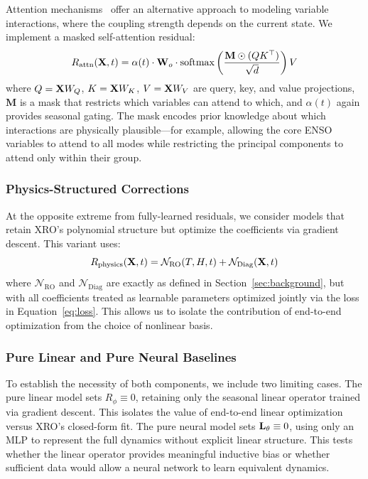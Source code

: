 Attention mechanisms~\cite{vaswani2017attention} offer an alternative approach to modeling variable interactions, where the coupling strength depends on the current state. We implement a masked self-attention residual:
\begin{equation}
    R_{\text{attn}}(\mathbf{X}, t) = \alpha(t) \cdot \mathbf{W}_o \cdot \text{softmax}\left(\frac{\mathbf{M} \odot (Q K^\top)}{\sqrt{d}}\right) V
\end{equation}
where $Q = \mathbf{X} W_Q$, $K = \mathbf{X} W_K$, $V = \mathbf{X} W_V$ are query, key, and value projections, $\mathbf{M}$ is a mask that restricts which variables can attend to which, and $\alpha(t)$ again provides seasonal gating. The mask encodes prior knowledge about which interactions are physically plausible---for example, allowing the core ENSO variables to attend to all modes while restricting the principal components to attend only within their group.

\subsubsection{Physics-Structured Corrections}

At the opposite extreme from fully-learned residuals, we consider models that retain XRO's polynomial structure but optimize the coefficients via gradient descent. This variant uses:
\begin{equation}
    R_{\text{physics}}(\mathbf{X}, t) = \mathcal{N}_{\text{RO}}(T, H, t) + \mathcal{N}_{\text{Diag}}(\mathbf{X}, t)
\end{equation}
where $\mathcal{N}_{\text{RO}}$ and $\mathcal{N}_{\text{Diag}}$ are exactly as defined in Section~\ref{sec:background}, but with all coefficients treated as learnable parameters optimized jointly via the loss in Equation~\ref{eq:loss}. This allows us to isolate the contribution of end-to-end optimization from the choice of nonlinear basis.

\subsubsection{Pure Linear and Pure Neural Baselines}

To establish the necessity of both components, we include two limiting cases. The pure linear model sets $R_\phi \equiv 0$, retaining only the seasonal linear operator trained via gradient descent. This isolates the value of end-to-end linear optimization versus XRO's closed-form fit. The pure neural model sets $\mathbf{L}_\theta \equiv 0$, using only an MLP to represent the full dynamics without explicit linear structure. This tests whether the linear operator provides meaningful inductive bias or whether sufficient data would allow a neural network to learn equivalent dynamics.

